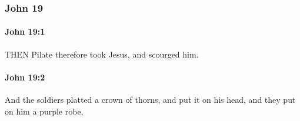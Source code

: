 	\subsubsection{John 19} %
		\label{JOHN-19}
		
		\paragraph{John 19:1} %
			\label{JOHN-19-1}

			THEN Pilate therefore took Jesus, and scourged him. 

			\begin{framed}
				\scriptsize
				\begin{compactdesc}
					\item[SBLG] 
				\end{compactdesc}
			\end{framed}

		\paragraph{John 19:2} %
			\label{JOHN-19-2}

			And the soldiers platted a crown of thorns, and put it on his head, and they put on him a purple robe,

